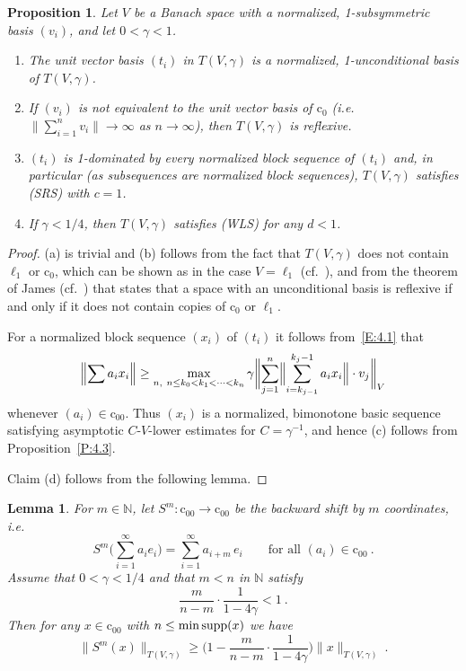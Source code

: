 \documentclass[11pt,leqno]{amsart}
\newtheorem{lem}[thm]{Lemma}
\newtheorem{prop}[thm]{Proposition}
\theoremstyle{definition}
\newcommand{\N}{\mathbb{N}}
\newcommand{\supp}{{\rm supp}}
\newcommand{\coo}{\mathrm{c}_{00}}
\newcommand{\co}{\mathrm{c}_0}
\newcommand{\norm}[1]{\lVert#1\rVert}
\newcommand{\bignorm}[1]{\bigl\lVert#1\bigr\rVert}
\newcommand{\Bignorm}[1]{\Bigl\lVert#1\Bigr\rVert}
\newcommand{\biggnorm}[1]{\biggl\lVert#1\biggr\rVert}
\begin{document}
\begin{prop}\label{P:4.1}
  Let $V$ be a Banach space with a normalized, 1-subsymmetric basis
  $(v_i)$, and let $0<\gamma<1$.
  \begin{enumerate}
  \item[a)]
    The  unit vector basis $(t_i)$ in $T(V,\gamma)$ is a normalized,
    1-unconditional basis of $T(V,\gamma)$.
  \item[b)]
    If $(v_i)$ is not equivalent to the unit vector basis of $\co$
    (i.e.~$\bignorm{\sum_{i=1}^n v_i}\to\infty$ as
    $n\to\infty$), then $T(V,\gamma)$ is reflexive.
  \item[c)]
    $(t_i)$ is 1-dominated by every normalized block sequence of
    $(t_i)$ and, in particular (as subsequences are normalized block
    sequences), $T(V,\gamma)$ satisfies (SRS) with $c=1$.
  \item[d)]
    If $\gamma<1/4$, then $T(V,\gamma)$ satisfies (WLS) for any
    $d<1$.
  \end{enumerate}
\end{prop}
\begin{proof}
  (a) is trivial and (b) follows from the fact that $T(V,\gamma)$ does
  not contain $\ell_1$ or $\co$, which can be shown as in the case
  $V=\ell_1$ (cf.~\cite{CS}), and from the theorem of James
  (cf.~\cite{LT}) that states that a space with an unconditional
  basis is reflexive if and only if it does not contain copies of
  $\co$ or $\ell_1$.

  For a normalized block sequence $(x_i)$ of $(t_i)$ it follows
  from~\eqref{E:4.1} that
  $$ \Bignorm{\sum a_i x_i}\geq \max_{n,\ n\leq k_0<k_1<\dots<k_n}
  \gamma\biggnorm{\sum_{j=1}^n \Bignorm{\sum_{i=k_{j-1}}^{k_j-1} a_i
      x_i}\cdot v_j}_V$$
  whenever $(a_i)\in\coo$. Thus $(x_i)$ is a normalized, bimonotone
  basic sequence satisfying asymptotic $C$-$V$-lower estimates for
  $C=\gamma^{-1}$, and hence (c) follows from
  Proposition~\ref{P:4.3}.

  Claim (d) follows from the following lemma.
\end{proof}
\begin{lem}\label{L:4.2}
  For $m\in\N$, let $S^m\colon\coo\to\coo$ be the backward shift
  by $m$ coordinates, i.e.
  $$S^m\Big(\sum_{i=1}^\infty a_ie_i\Big)=\sum_{i=1}^\infty
  a_{i+m}\,e_i\qquad\text{for all } (a_i)\in\coo\ .$$
  Assume that $0<\gamma<1/4$ and that $m<n$ in $\N$ satisfy
  $$\frac{m}{n-m}\cdot \frac1{1-4\gamma}<1\ .$$
  Then for any $x\in \coo$ with $n\le \min\supp(x)$ we have
  $$\norm{S^m(x)}_{T(V,\gamma)}\geq\Big( 1-\frac{m}{n-m}
  \cdot\frac1{1-4\gamma}\Big)\norm{x}_{T(V,\gamma)}\ .$$
\end{lem}
\end{document}

